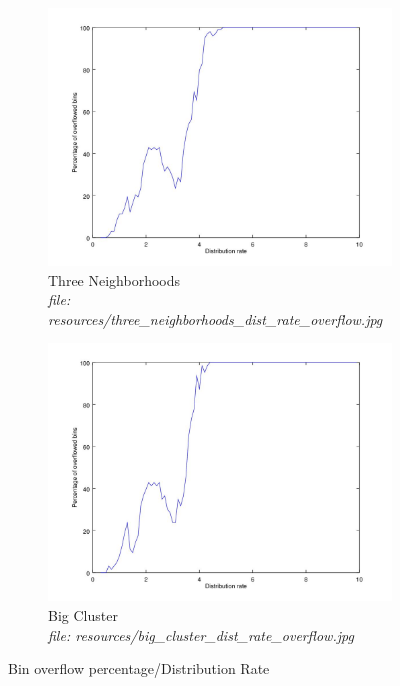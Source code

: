 \documentclass{article}
\begin{document}
		\begin{figure}[H]
			\centering
			\begin{subfigure}[b]{.5\textwidth}
				\includegraphics[width=\textwidth]{resources/three_neighborhoods_dist_rate_overflow.jpg}
				\caption{Three Neighborhoods \\\textit{file: resources/three\_neighborhoods\_dist\_rate\_overflow.jpg}}
				\label{fig:fig8a}
			\end{subfigure}\hfill%
			\begin{subfigure}[b]{.5\textwidth}
				\includegraphics[width=\textwidth]{resources/big_cluster_dist_rate_overflow.jpg}
				\caption{Big Cluster\\\textit{file: resources/big\_cluster\_dist\_rate\_overflow.jpg}}
				\label{fig:fig8b}
			\end{subfigure}
			\label{fig:fig8}
			\caption{Bin overflow percentage/Distribution Rate}
		\end{figure}
\end{document}
